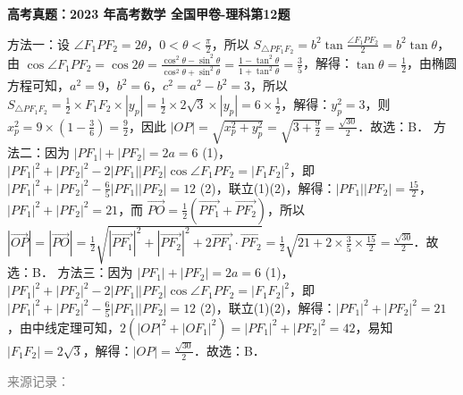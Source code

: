 \documentclass[UTF8,a4paper,11pt]{ctexart}
\newenvironment{gaokao}[1]{\par\medskip\noindent\textbf{高考真题：#1}\par\smallskip}{\par\medskip}
\begin{document}
\begin{gaokao}{2023 年高考数学 全国甲卷-理科第12题}
方法一：设 $\angle F_1PF_2 = 2\theta$，$0<\theta<\frac{\pi}{2}$，所以 $S_{\triangle PF_1F_2} = b^2\tan\frac{\angle F_1PF_2}{2} = b^2\tan\theta$，由 $\cos\angle F_1PF_2 = \cos2\theta = \frac{\cos^2\theta-\sin^2\theta}{\cos^2\theta+\sin^2\theta} = \frac{1-\tan^2\theta}{1+\tan^2\theta} = \frac{3}{5}$，解得：$\tan\theta = \frac{1}{2}$，由椭圆方程可知，$a^2=9$，$b^2=6$，$c^2=a^2-b^2=3$，所以 $S_{\triangle PF_1F_2} = \frac{1}{2}\times F_1F_2\times|y_p| = \frac{1}{2}\times2\sqrt{3}\times|y_p| = 6\times\frac{1}{2}$，解得：$y_p^2=3$，则 $x_p^2 = 9\times\left(1-\frac{3}{6}\right) = \frac{9}{2}$，因此 $|OP| = \sqrt{x_p^2+y_p^2} = \sqrt{3+\frac{9}{2}} = \frac{\sqrt{30}}{2}$．故选：B．
方法二：因为 $|PF_1|+|PF_2|=2a=6$ (1)，$|PF_1|^2+|PF_2|^2-2|PF_1||PF_2|\cos\angle F_1PF_2 = |F_1F_2|^2$，即 $|PF_1|^2+|PF_2|^2 - \frac{6}{5}|PF_1||PF_2| = 12$ (2)，联立(1)(2)，解得：$|PF_1||PF_2| = \frac{15}{2}$，$|PF_1|^2+|PF_2|^2 = 21$，而 $\overrightarrow{PO} = \frac{1}{2}(\overrightarrow{PF_1}+\overrightarrow{PF_2})$，所以 $|\overrightarrow{OP}| = |\overrightarrow{PO}| = \frac{1}{2}\sqrt{|\overrightarrow{PF_1}|^2+|\overrightarrow{PF_2}|^2+2\overrightarrow{PF_1}\cdot\overrightarrow{PF_2}} = \frac{1}{2}\sqrt{21+2\times\frac{3}{5}\times\frac{15}{2}} = \frac{\sqrt{30}}{2}$．故选：B．
方法三：因为 $|PF_1|+|PF_2|=2a=6$ (1)，$|PF_1|^2+|PF_2|^2-2|PF_1||PF_2|\cos\angle F_1PF_2 = |F_1F_2|^2$，即 $|PF_1|^2+|PF_2|^2 - \frac{6}{5}|PF_1||PF_2| = 12$ (2)，联立(1)(2)，解得：$|PF_1|^2+|PF_2|^2 = 21$，由中线定理可知，$2(|OP|^2+|OF_1|^2) = |PF_1|^2+|PF_2|^2 = 42$，易知 $|F_1F_2| = 2\sqrt{3}$，解得：$|OP| = \frac{\sqrt{30}}{2}$．故选：B．

\par\smallskip\textcolor{gray}{\footnotesize 来源记录：\texttt{}}

\end{gaokao}
\end{document}
